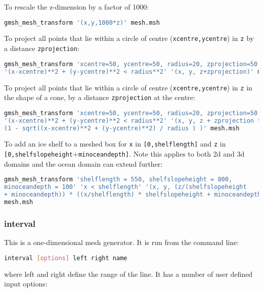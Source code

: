 To rescale the z-dimension by a factor of 1000:
\begin{lstlisting}[language = Bash]
gmsh_mesh_transform '(x,y,1000*z)' mesh.msh
\end{lstlisting}

To project all points that lie within a circle of centre (\lstinline[language = Bash]+xcentre,ycentre+) in \lstinline[language = Bash]+z+ by a distance \lstinline[language = Bash]+zprojection+:
\begin{lstlisting}[language = Bash]
gmsh_mesh_transform 'xcentre=50, ycentre=50, radius=20, zprojection=50'
'(x-xcentre)**2 + (y-ycentre)**2 < radius**2' '(x, y, z+zprojection)' mesh.msh
\end{lstlisting}

To project all points that lie within a circle of centre (\lstinline[language = Bash]+xcentre,ycentre+) in \lstinline[language = Bash]+z+ in the shape of a cone, by a distance \lstinline[language = Bash]+zprojection+ at the centre:
\begin{lstlisting}[language = Bash]
gmsh_mesh_transform 'xcentre=50, ycentre=50, radius=20, zprojection=50'
'(x-xcentre)**2 + (y-ycentre)**2 < radius**2' '(x, y, z + zprojection *
(1 - sqrt((x-xcentre)**2 + (y-ycentre)**2) / radius ) )' mesh.msh
\end{lstlisting}

To add an ice shelf to a meshed box for \lstinline[language = Bash]+x+ in \lstinline[language = Bash]+[0,shelflength]+ and \lstinline[language = Bash]+z+ in \lstinline[language = Bash]+[0,shelfslopeheight++\lstinline[language = Bash]+minoceandepth]+. Note this applies to both 2d and 3d domains and the ocean domain can extend further:
\begin{lstlisting}[language = Bash]
gmsh_mesh_transform 'shelflength = 550, shelfslopeheight = 800,
minoceandepth = 100' 'x < shelflength' '(x, y, (z/(shelfslopeheight
+ minoceandepth)) * ((x/shelflength) * shelfslopeheight + minoceandepth))'
mesh.msh
\end{lstlisting}


\subsubsection{interval}
\label{sec:interval}

This is a one-dimensional mesh generator. It is run from the command line:
\begin{lstlisting}[language = Bash]
interval [options] left right name
\end{lstlisting}
where left and right define the range of the line. It has a number of user defined input options:

